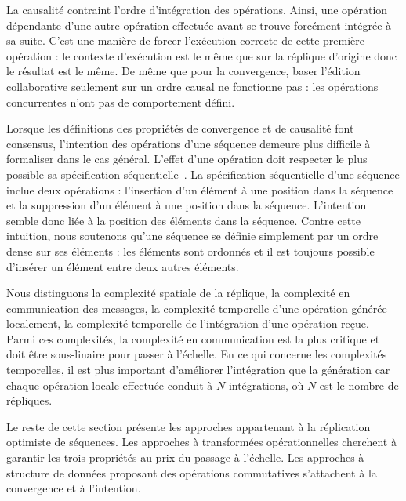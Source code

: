 \noindent La causalité contraint l'ordre d'intégration des opérations. Ainsi,
une opération dépendante d'une autre opération effectuée avant se trouve
forcément intégrée à sa suite. C'est une manière de forcer l'exécution correcte
de cette première opération : le contexte d'exécution est le même que sur la
réplique d'origine donc le résultat est le même.  
De même que pour la convergence, baser l'édition collaborative seulement sur un
ordre causal ne fonctionne pas : les opérations concurrentes n'ont pas de
comportement défini.

\noindent Lorsque les définitions des propriétés de convergence et de causalité
font consensus, l'intention des opérations d'une séquence demeure plus difficile
à formaliser dans le cas général. L'effet d'une opération doit respecter le plus
possible sa spécification séquentielle~\cite{bieniusa2012brief}. La
spécification séquentielle d'une séquence inclue deux opérations : l'insertion
d'un élément à une position dans la séquence et la suppression d'un élément à
une position dans la séquence. L'intention semble donc liée à la position des
éléments dans la séquence. Contre cette intuition, nous soutenons qu'une
séquence se définie simplement par un ordre dense sur ses éléments : les
éléments sont ordonnés et il est toujours possible d'insérer un élément entre
deux autres éléments.

Nous distinguons la complexité spatiale de la réplique, la complexité en
communication des messages, la complexité temporelle d'une opération générée
localement, la complexité temporelle de l'intégration d'une opération
reçue. Parmi ces complexités, la complexité en communication est la plus
critique et doit être sous-linaire pour passer à l'échelle. En ce qui concerne
les complexités temporelles, il est plus important d'améliorer l'intégration que
la génération car chaque opération locale effectuée conduit à $N$ intégrations,
où $N$ est le nombre de répliques.

Le reste de cette section présente les approches appartenant à la réplication
optimiste de séquences. Les approches à transformées opérationnelles cherchent à
garantir les trois propriétés au prix du passage à l'échelle. Les approches à
structure de données proposant des opérations commutatives s'attachent à la
convergence et à l'intention.


